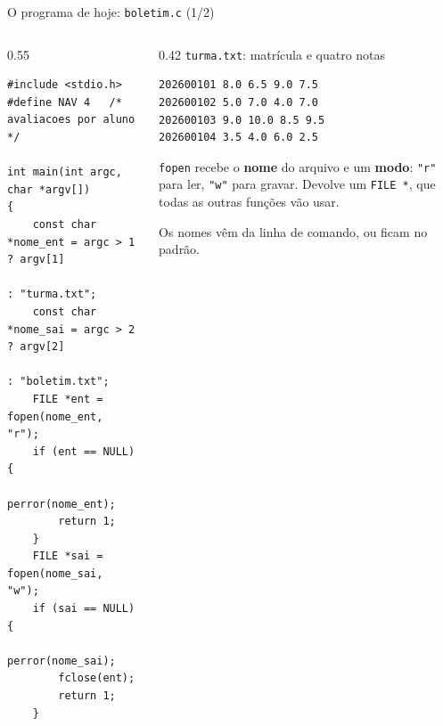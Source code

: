 \documentclass[aspectratio=169]{beamer}
\begin{document}
\begin{frame}[fragile]{O programa de hoje: \texttt{boletim.c} (1/2)}
  \vspace{-0.8em}
  \begin{columns}[T]
    \begin{column}{0.55\textwidth}
\begin{lstlisting}[style=codCs]
#include <stdio.h>
#define NAV 4   /* avaliacoes por aluno */

int main(int argc, char *argv[])
{
    const char *nome_ent = argc > 1 ? argv[1]
                                    : "turma.txt";
    const char *nome_sai = argc > 2 ? argv[2]
                                    : "boletim.txt";
    FILE *ent = fopen(nome_ent, "r");
    if (ent == NULL) {
        perror(nome_ent);
        return 1;
    }
    FILE *sai = fopen(nome_sai, "w");
    if (sai == NULL) {
        perror(nome_sai);
        fclose(ent);
        return 1;
    }
\end{lstlisting}
    \end{column}
    \begin{column}{0.42\textwidth}
      \texttt{turma.txt}: matrícula e quatro notas
\begin{lstlisting}[style=shellS]
202600101 8.0 6.5 9.0 7.5
202600102 5.0 7.0 4.0 7.0
202600103 9.0 10.0 8.5 9.5
202600104 3.5 4.0 6.0 2.5
\end{lstlisting}
      \small
      \texttt{fopen} recebe o \textbf{nome} do arquivo e um \textbf{modo}:
      \texttt{"r"} para ler, \texttt{"w"} para gravar. Devolve um
      \texttt{FILE *}, que todas as outras funções vão usar.

      \medskip
      Os nomes vêm da linha de comando, ou ficam no padrão.
    \end{column}
  \end{columns}
\end{frame}
\end{document}
